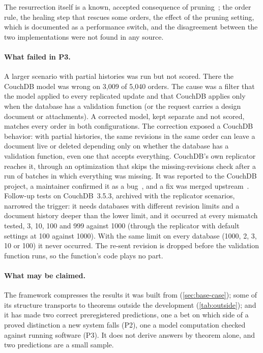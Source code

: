 The resurrection itself is a known, accepted consequence of pruning~\cite{couchdb988,couchdb1649}; the order rule,
the healing step that rescues some orders, the effect of the pruning setting, which is documented as a
performance switch, and the disagreement between the two implementations were not found in any source.

\paragraph{What failed in P3.}
A larger scenario with partial histories was run but not scored. There the CouchDB model was wrong on
3{,}009 of 5{,}040 orders. The cause was a filter that the model applied to every replicated update and
that CouchDB applies only when the database has a validation function (or the request carries a
design document or attachments). A corrected model, kept
separate and not scored, matches every order in both configurations. The correction exposed a CouchDB
behavior: with partial histories, the same revisions in the same order can leave a document live or
deleted depending only on whether the database has a validation function, even one that accepts
everything. CouchDB's own replicator reaches it, through an optimization that skips the
missing-revisions check after a run of batches in which everything was missing. It was reported to the
CouchDB project, a maintainer confirmed it as a bug~\cite{couchdb6162}, and a fix was merged
upstream~\cite{couchdb6168}. Follow-up tests on
CouchDB~3.5.3, archived with the replicator scenarios, narrowed the trigger: it needs databases with
different revision limits and a document history deeper than the lower limit, and it occurred at every
mismatch tested, 3, 10, 100 and 999 against 1000 (through the replicator with default settings at 100
against 1000). With the same limit on every database (1000, 2, 3, 10 or 100) it never occurred. The
re-sent revision is dropped before the validation function runs, so the function's code plays no part.

\paragraph{What may be claimed.}
The framework compresses the results it was built from (\cref{sec:base-case}); some of its structure transports
to theorems outside the development (\cref{tab:outside}); and it has made two correct preregistered
predictions, one a bet on which side of a proved distinction a new system falls (P2), one a model
computation checked against running software (P3). It does not derive answers by theorem alone, and
two predictions are a small sample.
